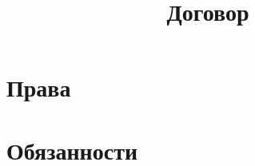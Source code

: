 \documentclass{article}
\title{Договор}
\begin{document}
\maketitle

\section{Права}





\section{Обязанности}




\end{document}
